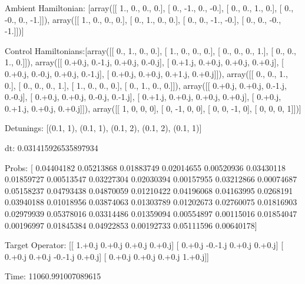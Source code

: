 \documentclass{article}
\begin{document}
    

\newpage

Ambient Hamiltonian: [array([[ 1.,  0.,  0.,  0.],
       [ 0., -1.,  0., -0.],
       [ 0.,  0.,  1.,  0.],
       [ 0., -0.,  0., -1.]]), array([[ 1.,  0.,  0.,  0.],
       [ 0.,  1.,  0.,  0.],
       [ 0.,  0., -1., -0.],
       [ 0.,  0., -0., -1.]])]

Control Hamiltonians:[array([[ 0.,  1.,  0.,  0.],
       [ 1.,  0.,  0.,  0.],
       [ 0.,  0.,  0.,  1.],
       [ 0.,  0.,  1.,  0.]]), array([[ 0.+0.j,  0.-1.j,  0.+0.j,  0.-0.j],
       [ 0.+1.j,  0.+0.j,  0.+0.j,  0.+0.j],
       [ 0.+0.j,  0.-0.j,  0.+0.j,  0.-1.j],
       [ 0.+0.j,  0.+0.j,  0.+1.j,  0.+0.j]]), array([[ 0.,  0.,  1.,  0.],
       [ 0.,  0.,  0.,  1.],
       [ 1.,  0.,  0.,  0.],
       [ 0.,  1.,  0.,  0.]]), array([[ 0.+0.j,  0.+0.j,  0.-1.j,  0.-0.j],
       [ 0.+0.j,  0.+0.j,  0.-0.j,  0.-1.j],
       [ 0.+1.j,  0.+0.j,  0.+0.j,  0.+0.j],
       [ 0.+0.j,  0.+1.j,  0.+0.j,  0.+0.j]]), array([[ 1,  0,  0,  0],
       [ 0, -1,  0,  0],
       [ 0,  0, -1,  0],
       [ 0,  0,  0,  1]])]

Detunings: [(0.1, 1), (0.1, 1), (0.1, 2), (0.1, 2), (0.1, 1)]

 dt: 0.031415926535897934

Probs: [ 0.04404182  0.05213868  0.01883749  0.02014655  0.00520936  0.03430118
  0.01859727  0.00513547  0.03227304  0.02030394  0.00157955  0.03212866
  0.00074687  0.05158237  0.04793438  0.04870059  0.01210422  0.04196068
  0.04163995  0.0268191   0.03940188  0.01018956  0.03874063  0.01303789
  0.01202673  0.02760075  0.01816903  0.02979939  0.05378016  0.03314486
  0.01359094  0.00554897  0.00115016  0.01854047  0.00196997  0.01845384
  0.04922853  0.00192733  0.05111596  0.00640178]

Target Operator: [[ 1.+0.j  0.+0.j  0.+0.j  0.+0.j]
 [ 0.+0.j -0.-1.j  0.+0.j  0.+0.j]
 [ 0.+0.j  0.+0.j -0.-1.j  0.+0.j]
 [ 0.+0.j  0.+0.j  0.+0.j  1.+0.j]]

Time: 11060.991007089615
\end{document}
